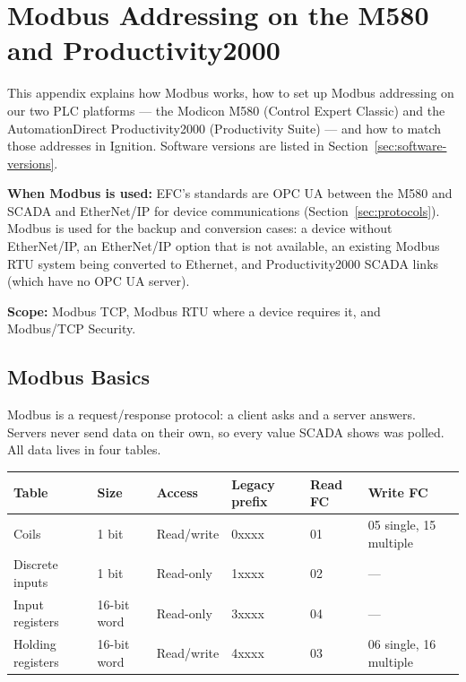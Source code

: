 \chapter{Modbus Addressing on the M580 and Productivity2000}
\label{app:modbus}

This appendix explains how Modbus works, how to set up Modbus addressing on our two PLC platforms --- the Modicon M580 (Control Expert Classic) and the AutomationDirect Productivity2000 (Productivity Suite) --- and how to match those addresses in Ignition. Software versions are listed in Section~\ref{sec:software-versions}.

\textbf{When Modbus is used:} EFC's standards are OPC UA between the M580 and SCADA and EtherNet/IP for device communications (Section~\ref{sec:protocols}). Modbus is used for the backup and conversion cases: a device without EtherNet/IP, an EtherNet/IP option that is not available, an existing Modbus RTU system being converted to Ethernet, and Productivity2000 SCADA links (which have no OPC UA server).

\textbf{Scope:} Modbus TCP, Modbus RTU where a device requires it, and Modbus/TCP Security.

\section{Modbus Basics}
Modbus is a request/response protocol: a client asks and a server answers. Servers never send data on their own, so every value SCADA shows was polled. All data lives in four tables.

\begin{longtable}{@{}P{3.25cm}P{2.18cm}P{2.39cm}P{2.18cm}P{1.74cm}P{3.91cm}@{}}
\toprule
\textbf{Table} & \textbf{Size} & \textbf{Access} & \textbf{Legacy prefix} & \textbf{Read FC} & \textbf{Write FC} \\
\midrule
\endhead
Coils & 1 bit & Read/write & 0xxxx & 01 & 05 single, 15 multiple \\
Discrete inputs & 1 bit & Read-only & 1xxxx & 02 & --- \\
Input registers & 16-bit word & Read-only & 3xxxx & 04 & --- \\
Holding registers & 16-bit word & Read/write & 4xxxx & 03 & 06 single, 16 multiple \\
\bottomrule
\end{longtable}

